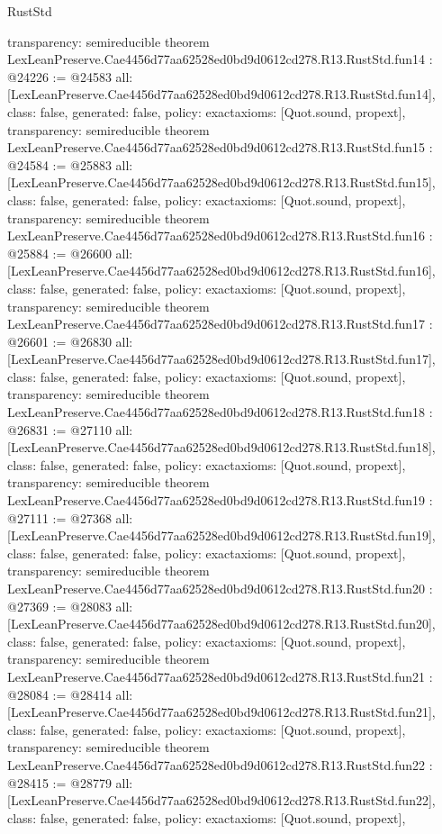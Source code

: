 \begin{lexlean}{RustStd}
\begin{coremodule}
{  transparency: semireducible
}
theorem LexLeanPreserve.Cae4456d77aa62528ed0bd9d0612cd278.R13.RustStd.fun14 : @24226 := @24583 {
  all: [LexLeanPreserve.Cae4456d77aa62528ed0bd9d0612cd278.R13.RustStd.fun14],
  class: false,
  generated: false,
  policy: exact{axioms: [Quot.sound, propext]},
  transparency: semireducible
}
theorem LexLeanPreserve.Cae4456d77aa62528ed0bd9d0612cd278.R13.RustStd.fun15 : @24584 := @25883 {
  all: [LexLeanPreserve.Cae4456d77aa62528ed0bd9d0612cd278.R13.RustStd.fun15],
  class: false,
  generated: false,
  policy: exact{axioms: [Quot.sound, propext]},
  transparency: semireducible
}
theorem LexLeanPreserve.Cae4456d77aa62528ed0bd9d0612cd278.R13.RustStd.fun16 : @25884 := @26600 {
  all: [LexLeanPreserve.Cae4456d77aa62528ed0bd9d0612cd278.R13.RustStd.fun16],
  class: false,
  generated: false,
  policy: exact{axioms: [Quot.sound, propext]},
  transparency: semireducible
}
theorem LexLeanPreserve.Cae4456d77aa62528ed0bd9d0612cd278.R13.RustStd.fun17 : @26601 := @26830 {
  all: [LexLeanPreserve.Cae4456d77aa62528ed0bd9d0612cd278.R13.RustStd.fun17],
  class: false,
  generated: false,
  policy: exact{axioms: [Quot.sound, propext]},
  transparency: semireducible
}
theorem LexLeanPreserve.Cae4456d77aa62528ed0bd9d0612cd278.R13.RustStd.fun18 : @26831 := @27110 {
  all: [LexLeanPreserve.Cae4456d77aa62528ed0bd9d0612cd278.R13.RustStd.fun18],
  class: false,
  generated: false,
  policy: exact{axioms: [Quot.sound, propext]},
  transparency: semireducible
}
theorem LexLeanPreserve.Cae4456d77aa62528ed0bd9d0612cd278.R13.RustStd.fun19 : @27111 := @27368 {
  all: [LexLeanPreserve.Cae4456d77aa62528ed0bd9d0612cd278.R13.RustStd.fun19],
  class: false,
  generated: false,
  policy: exact{axioms: [Quot.sound, propext]},
  transparency: semireducible
}
theorem LexLeanPreserve.Cae4456d77aa62528ed0bd9d0612cd278.R13.RustStd.fun20 : @27369 := @28083 {
  all: [LexLeanPreserve.Cae4456d77aa62528ed0bd9d0612cd278.R13.RustStd.fun20],
  class: false,
  generated: false,
  policy: exact{axioms: [Quot.sound, propext]},
  transparency: semireducible
}
theorem LexLeanPreserve.Cae4456d77aa62528ed0bd9d0612cd278.R13.RustStd.fun21 : @28084 := @28414 {
  all: [LexLeanPreserve.Cae4456d77aa62528ed0bd9d0612cd278.R13.RustStd.fun21],
  class: false,
  generated: false,
  policy: exact{axioms: [Quot.sound, propext]},
  transparency: semireducible
}
theorem LexLeanPreserve.Cae4456d77aa62528ed0bd9d0612cd278.R13.RustStd.fun22 : @28415 := @28779 {
  all: [LexLeanPreserve.Cae4456d77aa62528ed0bd9d0612cd278.R13.RustStd.fun22],
  class: false,
  generated: false,
  policy: exact{axioms: [Quot.sound, propext]},
}
\end{coremodule}
\end{lexlean}
